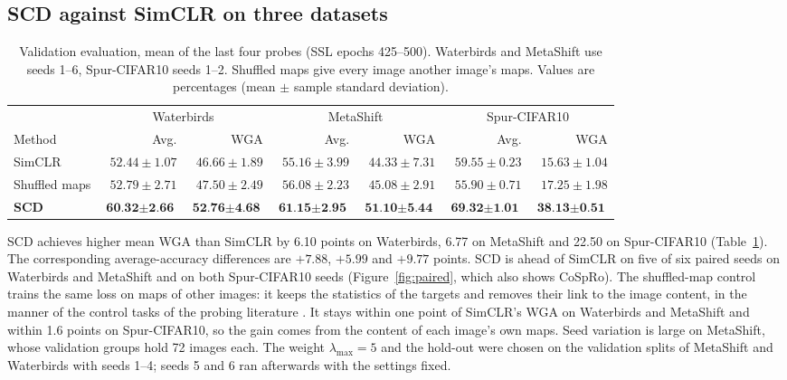 \documentclass{article}
\begin{document}
\subsection{SCD against SimCLR on three datasets}
\begin{table}[htbp]
\centering\small
\setlength{\tabcolsep}{3.5pt}
\caption{Validation evaluation, mean of the last four probes (SSL epochs 425--500). Waterbirds and MetaShift use seeds 1--6, Spur-CIFAR10 seeds 1--2. Shuffled maps give every image another image's maps. Values are percentages (mean $\pm$ sample standard deviation).}
\begin{tabular}{lrrrrrr}
\toprule
& \multicolumn{2}{c}{Waterbirds} & \multicolumn{2}{c}{MetaShift} & \multicolumn{2}{c}{Spur-CIFAR10} \\
Method & Avg. & WGA & Avg. & WGA & Avg. & WGA \\
\midrule
SimCLR & $52.44\pm1.07$ & $46.66\pm1.89$ & $55.16\pm3.99$ & $44.33\pm7.31$ & $59.55\pm0.23$ & $15.63\pm1.04$ \\
Shuffled maps & $52.79\pm2.71$ & $47.50\pm2.49$ & $56.08\pm2.23$ & $45.08\pm2.91$ & $55.90\pm0.71$ & $17.25\pm1.98$ \\
\textbf{SCD} & $\textbf{60.32}\pm\textbf{2.66}$ & $\textbf{52.76}\pm\textbf{4.68}$ & $\textbf{61.15}\pm\textbf{2.95}$ & $\textbf{51.10}\pm\textbf{5.44}$ & $\textbf{69.32}\pm\textbf{1.01}$ & $\textbf{38.13}\pm\textbf{0.51}$ \\
\bottomrule
\end{tabular}
\label{tab:main}
\end{table}

SCD achieves higher mean WGA than SimCLR by 6.10 points on Waterbirds, 6.77 on MetaShift and 22.50 on Spur-CIFAR10 (Table~\ref{tab:main}). The corresponding average-accuracy differences are $+7.88$, $+5.99$ and $+9.77$ points. SCD is ahead of SimCLR on five of six paired seeds on Waterbirds and MetaShift and on both Spur-CIFAR10 seeds (Figure~\ref{fig:paired}, which also shows CoSpRo). The shuffled-map control trains the same loss on maps of other images: it keeps the statistics of the targets and removes their link to the image content, in the manner of the control tasks of the probing literature \citep{hewitt2019control}. It stays within one point of SimCLR's WGA on Waterbirds and MetaShift and within 1.6 points on Spur-CIFAR10, so the gain comes from the content of each image's own maps. Seed variation is large on MetaShift, whose validation groups hold 72 images each. The weight $\lambda_{\max}=5$ and the hold-out were chosen on the validation splits of MetaShift and Waterbirds with seeds 1--4; seeds 5 and 6 ran afterwards with the settings fixed.
\end{document}
